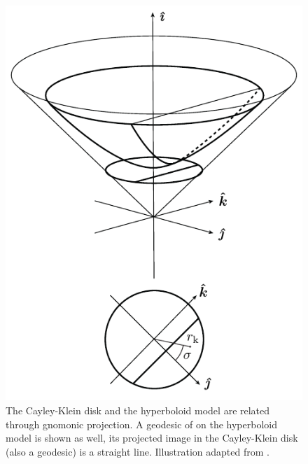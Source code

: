 \begin{figure}[ht!]
    \centering
    \includegraphics[scale=1]{media/other/cayley_disk-eps-converted-to}
    \caption{The Cayley-Klein disk and the hyperboloid model are related through gnomonic projection. A geodesic of on the hyperboloid model is shown as well, its projected image in the Cayley-Klein disk (also a geodesic) is a straight line. Illustration adapted from \citet{Balazs1986}.}
    \label{fig:cayley_disk}
\end{figure}


